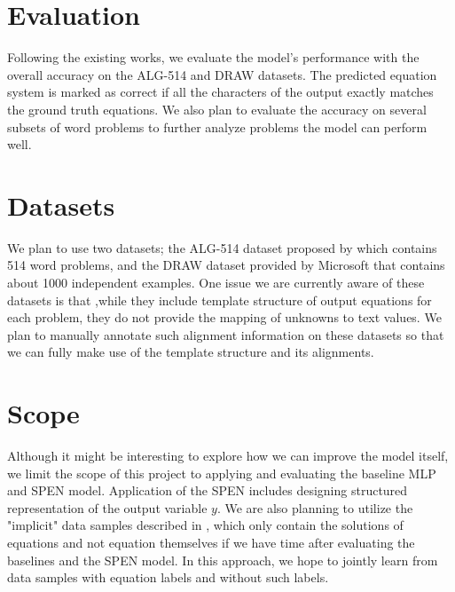 \documentclass[11pt,letterpaper]{article}
\begin{document}
\section{Evaluation}
Following the existing works, we evaluate the model's performance with the overall accuracy on the ALG-514 and DRAW datasets. The predicted equation system is marked as correct if all the characters of the output exactly matches the ground truth equations. We also plan to evaluate the accuracy on several subsets of word problems to further analyze problems the model can perform well.
\section{Datasets}
We plan to use two datasets; the ALG-514 dataset proposed by \cite{Kushman2014LearningTA} which contains 514 word problems, and the DRAW dataset provided by Microsoft that contains about 1000 independent examples. One issue we are currently aware of these datasets is that ,while they include template structure of output equations for each problem, they do not provide the mapping of unknowns to text values. We plan to manually annotate such alignment information on these datasets so that we can fully make use of the template structure and its alignments.
\section{Scope}
Although it might be interesting to explore how we can improve the model itself, we limit the scope of this project to applying and evaluating the baseline MLP and SPEN model. Application of the SPEN includes designing structured representation of the output variable $y$. We are also planning to utilize the "implicit" data samples described in \cite{UpChChYi16}, which only contain the solutions of equations and not equation themselves if we have time after evaluating the baselines and the SPEN model. In this approach, we hope to jointly learn from data samples with equation labels and without such labels.
\fi
%
\nocite{*}


\end{document}
